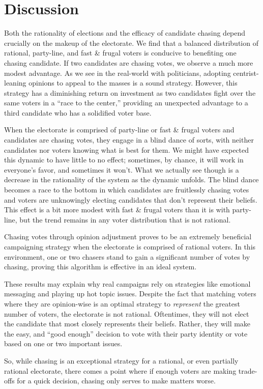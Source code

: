 \section{Discussion}
\label{sec:discussion}

Both the rationality of elections and the efficacy of candidate chasing depend
crucially on the makeup of the electorate. We find that a balanced distribution
of rational, party-line, and fast \& frugal voters is conducive to benefiting
one chasing candidate. If two candidates are chasing votes, we observe a much
more modest advantage. As we see in the real-world with politicians, adopting
centrist-leaning opinions to appeal to the masses is a sound strategy. However,
this strategy has a diminishing return on investment as two candidates fight
over the same voters in a ``race to the center,'' providing an unexpected
advantage to a third candidate who has a solidified voter base.

When the electorate is comprised of party-line or fast \& frugal voters and
candidates are chasing votes, they engage in a blind dance of sorts, with
neither candidates nor voters knowing what is best for them. We might have
expected this dynamic to have little to no effect; sometimes, by chance,
it will work in everyone's favor, and sometimes it won't. What we actually
see though is a decrease in the rationality of the system as the dynamic
unfolds. The blind dance becomes a race to the bottom in which candidates
are fruitlessly chasing votes and voters are unknowingly electing candidates
that don't represent their beliefs. This effect is a bit more modest with
fast \& frugal voters than it is with party-line, but the trend remains
in any voter distribution that is not rational.

Chasing votes through opinion adjustment proves to be an extremely beneficial
campaigning strategy when the electorate is comprised of rational voters. In
this environment, one or two chasers stand to gain a significant number of
votes by chasing, proving this algorithm is effective in an ideal system.

These results may explain why real campaigns rely on strategies like emotional
messaging and playing up hot topic issues. Despite the fact that matching
voters where they are opinion-wise is an optimal strategy to \textit{represent} 
the greatest number of voters, the electorate is not rational. Oftentimes, they
will not elect the candidate that most closely represents their beliefs. Rather,
they will make the easy, and ``good enough'' decision to vote with their party
identity or vote based on one or two important issues. 

So, while chasing is an exceptional strategy for a rational, or even partially
rational electorate, there comes a point where if enough voters are making
trade-offs for a quick decision, chasing only serves to make matters worse. 

\pagebreak
